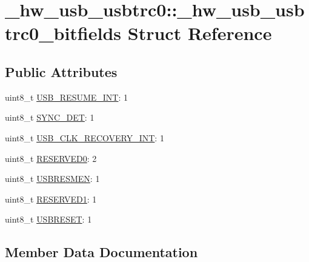 \hypertarget{struct__hw__usb__usbtrc0_1_1__hw__usb__usbtrc0__bitfields}{}\section{\+\_\+hw\+\_\+usb\+\_\+usbtrc0\+:\+:\+\_\+hw\+\_\+usb\+\_\+usbtrc0\+\_\+bitfields Struct Reference}
\label{struct__hw__usb__usbtrc0_1_1__hw__usb__usbtrc0__bitfields}
\subsection*{Public Attributes}
\begin{DoxyCompactItemize}
\item 
uint8\+\_\+t \hyperlink{struct__hw__usb__usbtrc0_1_1__hw__usb__usbtrc0__bitfields_af4fcfd50cbba679d052fec60533f8f2d}{U\+S\+B\+\_\+\+R\+E\+S\+U\+M\+E\+\_\+\+I\+NT}\+: 1
\item 
uint8\+\_\+t \hyperlink{struct__hw__usb__usbtrc0_1_1__hw__usb__usbtrc0__bitfields_af07ee5c7682f7c813fbe8d1169bcfc6c}{S\+Y\+N\+C\+\_\+\+D\+ET}\+: 1
\item 
uint8\+\_\+t \hyperlink{struct__hw__usb__usbtrc0_1_1__hw__usb__usbtrc0__bitfields_a26087701946a0413baa29c03737ccd86}{U\+S\+B\+\_\+\+C\+L\+K\+\_\+\+R\+E\+C\+O\+V\+E\+R\+Y\+\_\+\+I\+NT}\+: 1
\item 
uint8\+\_\+t \hyperlink{struct__hw__usb__usbtrc0_1_1__hw__usb__usbtrc0__bitfields_a8c7ae155e2cf9c3410d62ece9111cc3e}{R\+E\+S\+E\+R\+V\+E\+D0}\+: 2
\item 
uint8\+\_\+t \hyperlink{struct__hw__usb__usbtrc0_1_1__hw__usb__usbtrc0__bitfields_ab0384a192a782ff6ed48570b12031103}{U\+S\+B\+R\+E\+S\+M\+EN}\+: 1
\item 
uint8\+\_\+t \hyperlink{struct__hw__usb__usbtrc0_1_1__hw__usb__usbtrc0__bitfields_a948c48f7a6a2d83e392e96aa0201a350}{R\+E\+S\+E\+R\+V\+E\+D1}\+: 1
\item 
uint8\+\_\+t \hyperlink{struct__hw__usb__usbtrc0_1_1__hw__usb__usbtrc0__bitfields_ab580916f5030cb8f673944aa957e060c}{U\+S\+B\+R\+E\+S\+ET}\+: 1
\end{DoxyCompactItemize}


\subsection{Member Data Documentation}
